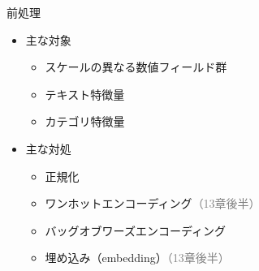 \documentclass[aspectratio=169, dvipdfmx, 14pt, xcolor={svgnames,dvipsnames}, t]{beamer}
\begin{document}

\begin{frame}{前処理}

  \begin{itemize}
    \tightlist
    \item
          主な対象

          \begin{itemize}
            \tightlist
            \item
                  スケールの異なる数値フィールド群
            \item
                  テキスト特徴量
            \item
                  カテゴリ特徴量
          \end{itemize}
    \item
          主な対処

          \begin{itemize}
            \tightlist
            \item
                  正規化
            \item
                  ワンホットエンコーディング\textcolor{gray}{（13章後半）}
            \item
                  バッグオブワーズエンコーディング
            \item
                  埋め込み（embedding）\textcolor{gray}{（13章後半）}
          \end{itemize}
  \end{itemize}

\end{frame}

\end{document}
